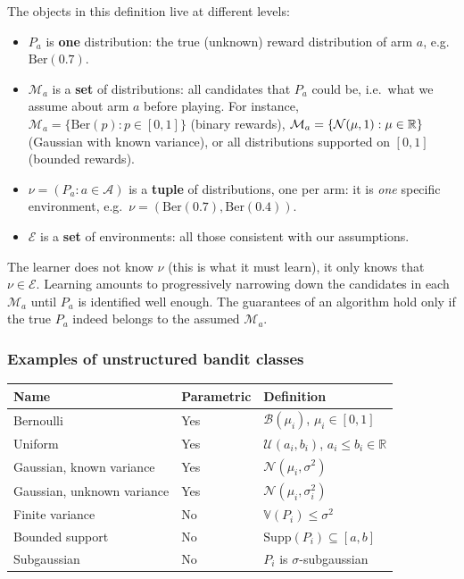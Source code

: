 \begin{framedremark}
    The objects in this definition live at different levels:
    \begin{itemize}
        \item $P_a$ is \textbf{one} distribution: the true (unknown) reward distribution of arm $a$, e.g.\ $\text{Ber}(0.7)$.
        \item $\mathcal{M}_a$ is a \textbf{set} of distributions: all candidates that $P_a$ could be, i.e.\ what we assume about arm $a$ before playing. For instance, $\mathcal{M}_a = \{\text{Ber}(p) : p \in [0,1]\}$ (binary rewards), $\mathcal{M}_a = \{\mathcal{N}(\mu, 1) : \mu \in \mathbb{R}\}$ (Gaussian with known variance), or all distributions supported on $[0,1]$ (bounded rewards).
        \item $\nu = (P_a : a \in \mathcal{A})$ is a \textbf{tuple} of distributions, one per arm: it is \textit{one} specific environment, e.g.\ $\nu = (\text{Ber}(0.7), \text{Ber}(0.4))$.
        \item $\mathcal{E}$ is a \textbf{set} of environments: all those consistent with our assumptions.
    \end{itemize}
    The learner does not know $\nu$ (this is what it must learn), it only knows that $\nu \in \mathcal{E}$. Learning amounts to progressively narrowing down the candidates in each $\mathcal{M}_a$ until $P_a$ is identified well enough. The guarantees of an algorithm hold only if the true $P_a$ indeed belongs to the assumed $\mathcal{M}_a$.
\end{framedremark}

\subsubsection*{Examples of unstructured bandit classes}

\begin{center}
\begin{tabular}{lll}
\hline
Name & Parametric & Definition \\
\hline
Bernoulli & Yes & $\mathcal{B}(\mu_i)$, $\mu_i \in [0,1]$ \\
Uniform & Yes & $\mathcal{U}(a_i, b_i)$, $a_i \leq b_i \in \mathbb{R}$ \\
Gaussian, known variance & Yes & $\mathcal{N}(\mu_i, \sigma^2)$ \\
Gaussian, unknown variance & Yes & $\mathcal{N}(\mu_i, \sigma_i^2)$ \\
Finite variance & No & $\mathbb{V}(P_i) \leq \sigma^2$ \\
Bounded support & No & $\mathrm{Supp}(P_i) \subseteq [a,b]$ \\
Subgaussian & No & $P_i$ is $\sigma$-subgaussian \\
\hline
\end{tabular}
\end{center}


